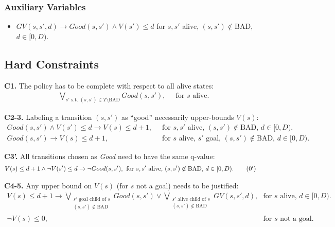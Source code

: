 \documentclass[a4paper]{article}
\newcommand{\smallpar}[1]{{\vspace{10pt}\noindent \bf #1.}}
\newcommand{\badtx}{\ensuremath{\mathrm{BAD}}}
\begin{document}
\subsubsection{Auxiliary Variables}
\begin{itemize}
 \item $GV(s, s', d) \rightarrow Good(s, s') \land V(s') \leq d$ for $s, s'$ alive, $(s, s') \not\in \badtx$, $d \in [0, D)$.
\end{itemize}

\newpage

\subsection{Hard Constraints}

\smallpar{C1}
The policy has to be complete with respect to all alive states:
\begin{align}
\bigvee_{s' \text{ s.t. } (s, s') \in T \setminus \badtx} Good(s, s'),&\;\; \text{for $s$ alive.}
\end{align}


\smallpar{C2-3} Labeling a transition $(s, s')$ as ``good'' necessarily upper-bounds $V(s)$:
\begin{align}
 Good(s, s') \land V(s') \leq d \rightarrow V(s) \leq d+1,&\;\; \text{for $s, s'$ alive, $(s, s') \not\in \badtx$, $d \in [0, D)$.} \\
 Good(s, s') \rightarrow V(s) \leq d+1,&\;\; \text{for $s$ alive, $s'$ goal, $(s, s') \not\in \badtx$, $d \in [0, D)$.}
\end{align}

\smallpar{C3'} All transitions chosen as \emph{Good} need to have the same q-value:
\begin{align}
 V(s) \leq d+1 \land \neg V(s') \leq d \rightarrow \neg Good(s, s'),&\;\; \text{for $s, s'$ alive, $(s, s') \not\in \badtx$, $d \in [0, D)$.} \tag{\theequation${}^\prime$}
\end{align}


\smallpar{C4-5} Any upper bound on $V(s)$ (for $s$ not a goal) needs to be justified:
\begin{align}
 V(s) \leq d+1 \rightarrow \bigvee_{\substack{
 s' \text{ goal child of } s\\
 (s, s') \not\in \badtx}} Good(s, s') \lor
 \bigvee_{\substack{
 s' \text{ alive child of } s\\
 (s, s') \not\in \badtx}} GV(s, s', d),&
 \;\; \text{for $s$ alive, $d \in [0, D)$.} \\
 \neg V(s) \leq 0,&\;\; \text{for $s$ not a goal.}
\end{align}
\end{document}

